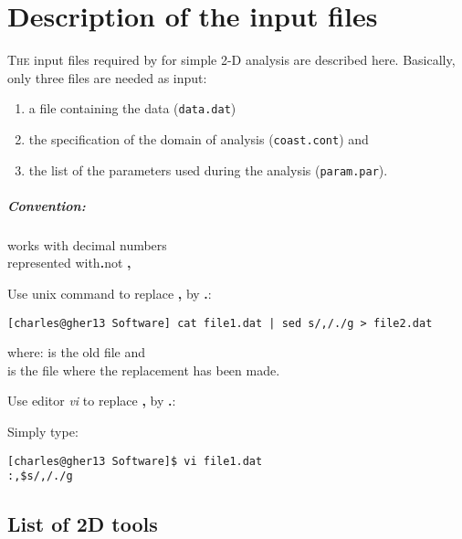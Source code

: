 \chapter{Description of the input files\label{chap:general}}

\lettrine[lines=2, loversize=0.0, lraise=0.5]{T}{he} input files required by \diva for simple 2-D analysis are described here. 
Basically, only three files are needed as input:

\begin{enumerate}
\item a file containing the data (\texttt{data.dat})
\item the specification of the domain of analysis (\texttt{coast.cont}) and 
\item the list of the parameters used during the analysis (\texttt{param.par}).
\end{enumerate}


\minitoc

\newpage %


\paragraph*{Convention:} \diva works with decimal numbers\\ 
represented with\quad \textbf{.}\quad  not \quad \textbf{,}

\btips
Use unix command  to replace \textbf{,} by \textbf{.}:
\begin{lstlisting}[style=Bash]
[charles@gher13 Software] cat file1.dat | sed s/,/./g > file2.dat
\end{lstlisting}

where:  is the old file and \\
\hphantom{where:}  is the file where the replacement has been made.
\etips


\btips
Use editor \textsl{vi} to replace \textbf{,} by \textbf{.}:

Simply type:
\begin{lstlisting}[style=Bash]
[charles@gher13 Software]$ vi file1.dat
:,$s/,/./g
\end{lstlisting}

\etips



\section{List of 2D tools}


